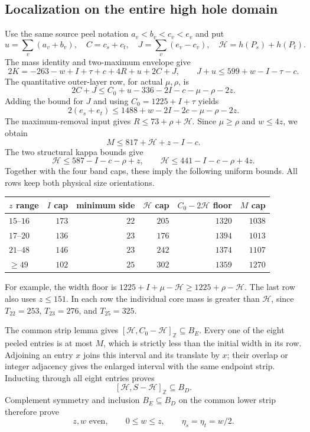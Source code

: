 \documentclass[11pt,letterpaper]{article}
\newcommand{\Z}{\mathbb Z}\newcommand{\R}{\mathbb R}
\theoremstyle{definition}\newtheorem{definition}[theorem]{Definition}
\begin{document}
\subsection{Localization on the entire high hole domain}
Use the same source peel notation $a_v<b_v<c_v<e_v$ and put
\[
u=\sum_v(a_v+b_v),\quad C=c_s+c_t,\quad
J=\sum_v(e_v-c_v),\quad\mathcal H=h(P_s)+h(P_t).
\]
The mass identity and two-maximum envelope give
\[
2K=-263-w+I+\tau+c+4R+u+2C+J,
\qquad J+u\le599+w-I-\tau-c.
\]
The quantitative outer-layer row, for actual $\mu,\rho$, is
\[
2C+J\le C_0+u-336-2I-c-\mu-\rho-2z.
\]
Adding the bound for $J$ and using $C_0=1225+I+\tau$ yields
\[
2(e_s+e_t)\le1488+w-2I-2c-\mu-\rho-2z.
\]
The maximum-removal input gives $R\le73+\rho+\mathcal H$. Since $\mu\ge\rho$ and $w\le4z$, we obtain
\begin{equation}\label{eq:h-M}
M\le817+\mathcal H+z-I-c.
\end{equation}
The two structural kappa bounds give
\[
\mathcal H\le587-I-c-\rho+z,
\qquad\mathcal H\le441-I-c-\rho+4z.
\]
Together with the four band caps, these imply the following uniform bounds. All rows keep both physical size orientations.
\begin{center}\small
\begin{tabular}{@{}lrrrrr@{}}\toprule
$z$ range&$I$ cap&minimum side&$\mathcal H$ cap&$C_0-2\mathcal H$ floor&$M$ cap\\\midrule
$15$--$16$&$173$&$22$&$205$&$1320$&$1038$\\
$17$--$20$&$136$&$23$&$176$&$1394$&$1013$\\
$21$--$48$&$146$&$23$&$242$&$1374$&$1107$\\
$\ge49$&$102$&$25$&$302$&$1359$&$1270$\\\bottomrule
\end{tabular}
\end{center}
For example, the width floor is $1225+I+\mu-\mathcal H\ge1225+\rho-\mathcal H$. The last row also uses $z\le151$. In each row the individual core mass is greater than $\mathcal H$, since $T_{22}=253$, $T_{23}=276$, and $T_{25}=325$.

The common strip lemma gives $[\mathcal H,C_0-\mathcal H]_{\Z}\subseteq B_E$. Every one of the eight peeled entries is at most $M$, which is strictly less than the initial width in its row. Adjoining an entry $x$ joins this interval and its translate by $x$; their overlap or integer adjacency gives the enlarged interval with the same endpoint strip. Inducting through all eight entries proves
\[
[\mathcal H,S-\mathcal H]_{\Z}\subseteq B_D.
\]
Complement symmetry and inclusion $B_E\subseteq B_D$ on the common lower strip therefore prove
\begin{equation}\label{eq:h-localized}
z,w\text{ even},\qquad0\le w\le z,\qquad\eta_s=\eta_t=w/2.
\end{equation}
\end{document}
